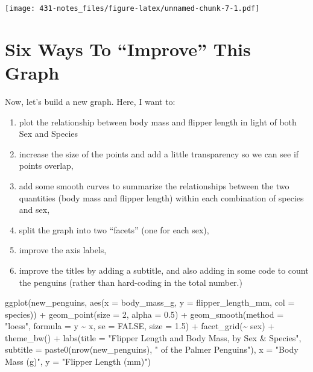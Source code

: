\documentclass[
]{book}
\newenvironment{Shaded}{\begin{snugshade}}{\end{snugshade}}
\newcommand{\AttributeTok}[1]{\textcolor[rgb]{0.77,0.63,0.00}{#1}}
\newcommand{\ConstantTok}[1]{\textcolor[rgb]{0.00,0.00,0.00}{#1}}
\newcommand{\DecValTok}[1]{\textcolor[rgb]{0.00,0.00,0.81}{#1}}
\newcommand{\FloatTok}[1]{\textcolor[rgb]{0.00,0.00,0.81}{#1}}
\newcommand{\FunctionTok}[1]{\textcolor[rgb]{0.00,0.00,0.00}{#1}}
\newcommand{\NormalTok}[1]{#1}
\newcommand{\SpecialCharTok}[1]{\textcolor[rgb]{0.00,0.00,0.00}{#1}}
\newcommand{\StringTok}[1]{\textcolor[rgb]{0.31,0.60,0.02}{#1}}
\providecommand{\tightlist}{%
  \setlength{\itemsep}{0pt}\setlength{\parskip}{0pt}}
\begin{document}
\texttt{[image: 431-notes\_files/figure-latex/unnamed-chunk-7-1.pdf]}

\hypertarget{six-ways-to-improve-this-graph}{%
\section{Six Ways To ``Improve'' This Graph}\label{six-ways-to-improve-this-graph}}

Now, let's build a new graph. Here, I want to:

\begin{enumerate}
\def\labelenumi{\arabic{enumi}.}
\tightlist
\item
  plot the relationship between body mass and flipper length in light of both Sex and Species
\item
  increase the size of the points and add a little transparency so we can see if points overlap,
\item
  add some smooth curves to summarize the relationships between the two quantities (body mass and flipper length) within each combination of species and sex,
\item
  split the graph into two ``facets'' (one for each sex),
\item
  improve the axis labels,
\item
  improve the titles by adding a subtitle, and also adding in some code to count the penguins (rather than hard-coding in the total number.)
\end{enumerate}

\begin{Shaded}
\begin{Highlighting}[]
\FunctionTok{ggplot}\NormalTok{(new\_penguins, }\FunctionTok{aes}\NormalTok{(}\AttributeTok{x =}\NormalTok{ body\_mass\_g, }\AttributeTok{y =}\NormalTok{ flipper\_length\_mm, }
                         \AttributeTok{col =}\NormalTok{ species)) }\SpecialCharTok{+}
    \FunctionTok{geom\_point}\NormalTok{(}\AttributeTok{size =} \DecValTok{2}\NormalTok{, }\AttributeTok{alpha =} \FloatTok{0.5}\NormalTok{) }\SpecialCharTok{+} 
    \FunctionTok{geom\_smooth}\NormalTok{(}\AttributeTok{method =} \StringTok{"loess"}\NormalTok{, }\AttributeTok{formula =}\NormalTok{ y }\SpecialCharTok{\textasciitilde{}}\NormalTok{ x, }
                \AttributeTok{se =} \ConstantTok{FALSE}\NormalTok{, }\AttributeTok{size =} \FloatTok{1.5}\NormalTok{) }\SpecialCharTok{+}
    \FunctionTok{facet\_grid}\NormalTok{(}\SpecialCharTok{\textasciitilde{}}\NormalTok{ sex) }\SpecialCharTok{+}
    \FunctionTok{theme\_bw}\NormalTok{() }\SpecialCharTok{+} 
    \FunctionTok{labs}\NormalTok{(}\AttributeTok{title =} \StringTok{"Flipper Length and Body Mass, by Sex \& Species"}\NormalTok{,}
         \AttributeTok{subtitle =} \FunctionTok{paste0}\NormalTok{(}\FunctionTok{nrow}\NormalTok{(new\_penguins), }\StringTok{" of the Palmer Penguins"}\NormalTok{),}
         \AttributeTok{x =} \StringTok{"Body Mass (g)"}\NormalTok{, }
         \AttributeTok{y =} \StringTok{"Flipper Length (mm)"}\NormalTok{)}
\end{Highlighting}
\end{Shaded}
\end{document}
